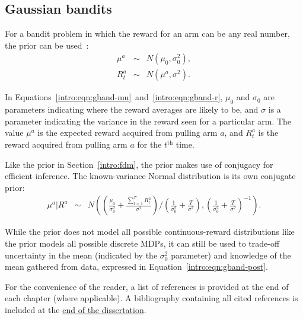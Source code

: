 \subsection{Gaussian bandits}

For a bandit problem in which the reward for an arm can be any real number, the  prior can be used~\cite{wang05}:
\begin{eqnarray}
\label{intro:eqn:gband-mu}\mu^a &\sim& N(\mu_0, \sigma^2_0),\\
\label{intro:eqn:gband-r}R_t^a &\sim& N(\mu^a, \sigma^2).
\end{eqnarray}

In Equations~\ref{intro:eqn:gband-mu}~and~\ref{intro:eqn:gband-r}, $\mu_0$ and $\sigma_0$ are parameters indicating where the reward averages are likely to be, and $\sigma$ is a parameter indicating the variance in the reward seen for a particular arm. The value $\mu^a$ is the expected reward acquired from pulling arm $a$, and $R_t^a$ is the reward acquired from pulling arm $a$ for the $t^{\mbox{th}}$ time.

Like the  prior in Section~\ref{intro:fdm}, the  prior makes use of conjugacy for efficient inference. The known-variance Normal distribution is its own conjugate prior:
\begin{eqnarray}
\label{intro:eqn:gband-post}\mu^a|R^a &\sim& N\left(\left(\frac{\mu_0}{\sigma_0^2} + \frac{\sum_{t=1}^T R_t^a}{\sigma^2}\right)/\left(\frac 1 {\sigma_0^2} + \frac T {\sigma^2} \right), \left(\frac 1 {\sigma_0^2} + \frac T {\sigma^2} \right)^{-1}\right).
\end{eqnarray}

While the  prior does not model all possible continuous-reward distributions like the  prior models all possible discrete MDPs, it can still be used to trade-off uncertainty in the mean (indicated by the $\sigma_0^2$ parameter) and knowledge of the mean gathered from data, expressed in Equation~\ref{intro:eqn:gband-post}.



%
\ifperchapterbib%
For the convenience of the reader, a list of references is provided at the end of each chapter (where applicable).
\ifendbib%
A bibliography containing all cited references is included at the \hyperref[sec:bibliography]{end of the dissertation}.
\else\fi%
\cbend%
\else\fi%